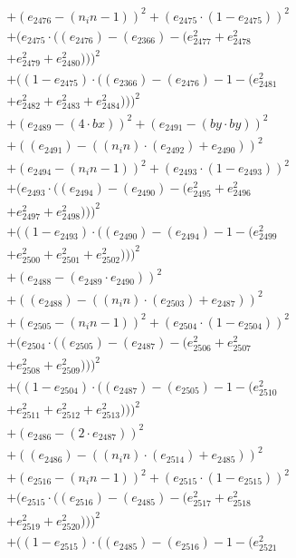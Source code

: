 \documentclass[10pt, a4paper]{article}
\begin{document}
\begin{small}
\begin{align*}
& + (e_{2476} - (n_in - 1))^{2} + (e_{2475}  \cdot  (1 - e_{2475}))^{2} \\
& + (e_{2475}  \cdot  ((e_{2476}) - (e_{2366}) - (e_{2477}^{2} + e_{2478}^{2} \\
& + e_{2479}^{2} + e_{2480}^{2})))^{2} \\
& + ((1 - e_{2475})  \cdot  ((e_{2366}) - (e_{2476}) - 1 - (e_{2481}^{2} \\
& + e_{2482}^{2} + e_{2483}^{2} + e_{2484}^{2})))^{2} \\
& + (e_{2489} - (4  \cdot  bx))^{2} + (e_{2491} - (by  \cdot  by))^{2} \\
& + ((e_{2491}) - ((n_in)  \cdot  (e_{2492}) + e_{2490}))^{2} \\
& + (e_{2494} - (n_in - 1))^{2} + (e_{2493}  \cdot  (1 - e_{2493}))^{2} \\
& + (e_{2493}  \cdot  ((e_{2494}) - (e_{2490}) - (e_{2495}^{2} + e_{2496}^{2} \\
& + e_{2497}^{2} + e_{2498}^{2})))^{2} \\
& + ((1 - e_{2493})  \cdot  ((e_{2490}) - (e_{2494}) - 1 - (e_{2499}^{2} \\
& + e_{2500}^{2} + e_{2501}^{2} + e_{2502}^{2})))^{2} \\
& + (e_{2488} - (e_{2489}  \cdot  e_{2490}))^{2} \\
& + ((e_{2488}) - ((n_in)  \cdot  (e_{2503}) + e_{2487}))^{2} \\
& + (e_{2505} - (n_in - 1))^{2} + (e_{2504}  \cdot  (1 - e_{2504}))^{2} \\
& + (e_{2504}  \cdot  ((e_{2505}) - (e_{2487}) - (e_{2506}^{2} + e_{2507}^{2} \\
& + e_{2508}^{2} + e_{2509}^{2})))^{2} \\
& + ((1 - e_{2504})  \cdot  ((e_{2487}) - (e_{2505}) - 1 - (e_{2510}^{2} \\
& + e_{2511}^{2} + e_{2512}^{2} + e_{2513}^{2})))^{2} \\
& + (e_{2486} - (2  \cdot  e_{2487}))^{2} \\
& + ((e_{2486}) - ((n_in)  \cdot  (e_{2514}) + e_{2485}))^{2} \\
& + (e_{2516} - (n_in - 1))^{2} + (e_{2515}  \cdot  (1 - e_{2515}))^{2} \\
& + (e_{2515}  \cdot  ((e_{2516}) - (e_{2485}) - (e_{2517}^{2} + e_{2518}^{2} \\
& + e_{2519}^{2} + e_{2520}^{2})))^{2} \\
& + ((1 - e_{2515})  \cdot  ((e_{2485}) - (e_{2516}) - 1 - (e_{2521}^{2} \\

\end{align*}
\end{small}
\end{document}
